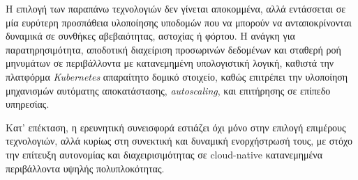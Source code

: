 Η επιλογή των παραπάνω τεχνολογιών δεν γίνεται αποκομμένα, αλλά εντάσσεται σε μία ευρύτερη προσπάθεια υλοποίησης υποδομών που να μπορούν να ανταποκρίνονται δυναμικά σε συνθήκες αβεβαιότητας, αστοχίας ή φόρτου. Η ανάγκη για παρατηρησιμότητα, αποδοτική διαχείριση προσωρινών δεδομένων και σταθερή ροή μηνυμάτων σε περιβάλλοντα με κατανεμημένη υπολογιστική λογική, καθιστά την πλατφόρμα \textit{Kubernetes} απαραίτητο δομικό στοιχείο, καθώς επιτρέπει την υλοποίηση μηχανισμών αυτόματης αποκατάστασης, \textit{autoscaling}, και επιτήρησης σε επίπεδο υπηρεσίας.

Κατ’ επέκταση, η ερευνητική συνεισφορά εστιάζει όχι μόνο στην επιλογή επιμέρους τεχνολογιών, αλλά κυρίως στη συνεκτική και δυναμική ενορχήστρωσή τους, με στόχο την επίτευξη αυτονομίας και διαχειρισιμότητας σε cloud-native κατανεμημένα περιβάλλοντα υψηλής πολυπλοκότητας.
